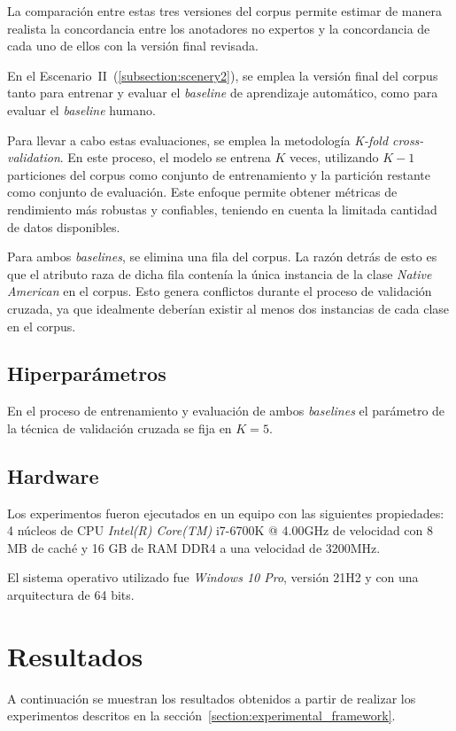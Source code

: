 La comparaci\'on entre estas tres versiones del corpus permite estimar de manera realista la concordancia entre los anotadores 
no expertos y la concordancia de cada uno de ellos con la versi\'on final revisada. 

En el Escenario~II~(\ref{subsection:scenery2}), se emplea la versi\'on final del corpus tanto para entrenar y evaluar el 
\emph{baseline} de aprendizaje autom\'atico, como para evaluar el \emph{baseline} humano.

Para llevar a cabo estas evaluaciones, se emplea la 
metodolog\'ia \emph{K-fold cross-validation}. En este proceso, el modelo se entrena $K$ veces, utilizando 
$K-1$ particiones del corpus como conjunto de entrenamiento y la partici\'on restante como conjunto de evaluaci\'on.
Este enfoque permite obtener m\'etricas de rendimiento m\'as robustas y confiables, teniendo en cuenta 
la limitada cantidad de datos disponibles.

Para ambos \emph{baselines}, se elimina una fila del corpus. La raz\'on detr\'as de esto es que el atributo raza de dicha 
fila conten\'ia la \'unica instancia de la clase \emph{Native American} en el corpus. 
Esto genera conflictos durante el proceso de validaci\'on cruzada, ya que idealmente deber\'ian existir al menos dos 
instancias de cada clase en el corpus.

\subsection{Hiperpar\'ametros}
En el proceso de entrenamiento y evaluaci\'on de ambos \emph{baselines} el par\'ametro de la t\'ecnica de validaci\'on
cruzada se fija en $K=5$. 

\subsection{Hardware}
Los experimentos fueron ejecutados en un equipo con las siguientes propiedades: 4 n\'ucleos de CPU \emph{Intel(R) Core(TM)} i7-6700K
@ 4.00GHz de velocidad con 8 MB de cach\'e y 16 GB de RAM DDR4 a una velocidad de 3200MHz.

El sistema operativo utilizado fue \emph{Windows 10 Pro}, versi\'on 21H2 y con una arquitectura de 64 bits.

\section{Resultados}\label{section:results}
A continuaci\'on se muestran los resultados obtenidos a partir de realizar los experimentos descritos en la 
secci\'on~\ref{section:experimental_framework}.


